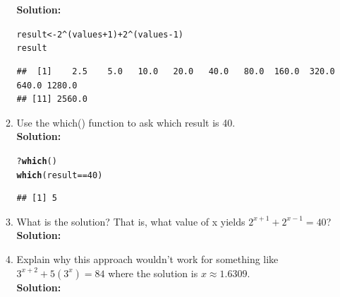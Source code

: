 \documentclass{article}\usepackage[]{graphicx}\usepackage[]{xcolor}
\makeatletter
\newcommand{\hlnum}[1]{\textcolor[rgb]{0.686,0.059,0.569}{#1}}%
\newcommand{\hlopt}[1]{\textcolor[rgb]{0,0,0}{#1}}%
\newcommand{\hldef}[1]{\textcolor[rgb]{0.345,0.345,0.345}{#1}}%
\newcommand{\hlkwb}[1]{\textcolor[rgb]{0.69,0.353,0.396}{#1}}%
\newcommand{\hlkwd}[1]{\textcolor[rgb]{0.737,0.353,0.396}{\textbf{#1}}}%
\newenvironment{kframe}{%
 \def\at@end@of@kframe{}%
 \ifinner\ifhmode%
  \def\at@end@of@kframe{\end{minipage}}%
  \begin{minipage}{\columnwidth}%
 \fi\fi%
 \def\FrameCommand##1{\hskip\@totalleftmargin \hskip-\fboxsep
 \colorbox{shadecolor}{##1}\hskip-\fboxsep
     \hskip-\linewidth \hskip-\@totalleftmargin \hskip\columnwidth}%
 \MakeFramed {\advance\hsize-\width
   \@totalleftmargin\z@ \linewidth\hsize
   \@setminipage}}%
 {\par\unskip\endMakeFramed%
 \at@end@of@kframe}
\newenvironment{knitrout}{}{} %
\makeatother
\begin{document}
\begin{enumerate}
\begin{enumerate}
\textbf{Solution:}
\begin{knitrout}\scriptsize
{}\color{fgcolor}\begin{kframe}
\begin{alltt}
\hldef{result} \hlkwb{<-} \hlnum{2}\hlopt{^}\hldef{(values}\hlopt{+}\hlnum{1}\hldef{)} \hlopt{+} \hlnum{2}\hlopt{^}\hldef{(values}\hlopt{-}\hlnum{1}\hldef{)}
\hldef{result}
\end{alltt}
\begin{verbatim}
##  [1]    2.5    5.0   10.0   20.0   40.0   80.0  160.0  320.0  640.0 1280.0
## [11] 2560.0
\end{verbatim}
\end{kframe}
\end{knitrout}
  \item Use the which() function to ask which result is 40.\\
\textbf{Solution:}
\begin{knitrout}\scriptsize
{}\color{fgcolor}\begin{kframe}
\begin{alltt}
\hlopt{?}\hlkwd{which}\hldef{()}
\hlkwd{which}\hldef{(result}\hlopt{==}\hlnum{40}\hldef{)}
\end{alltt}
\begin{verbatim}
## [1] 5
\end{verbatim}
\end{kframe}
\end{knitrout}
  \item What is the solution? That is, what value of x yields $2^{x+1} +2^{x-1} = 40$?\\
\textbf{Solution:}
  \item Explain why this approach wouldn't work for something like $3^{x+2} + 5 (3^x) = 84$ where the solution is $x \approx 1.6309$.\\
\textbf{Solution:}
\end{enumerate}
\end{enumerate}
\end{document}
